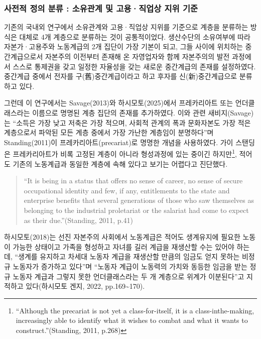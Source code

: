 \documentclass[
  letterpaper,
  DIV=11,
  numbers=noendperiod]{scrartcl}
\begin{document}
\subsubsection{사전적 정의 분류 : 소유관계 및 고용·직업상 지위
기준}\label{uxc0acuxc804uxc801-uxc815uxc758-uxbd84uxb958-uxc18cuxc720uxad00uxacc4-uxbc0f-uxace0uxc6a9uxc9c1uxc5c5uxc0c1-uxc9c0uxc704-uxae30uxc900}

기존의 국내외 연구에서 소유관계와 고용·직업상 지위를 기준으로 계층을
분류하는 방식은 대체로 4개 계층으로 분류하는 것이 공통적이었다.
생산수단의 소유여부에 따라 자본가·고용주와 노동계급의 2개 집단이 가장
기본이 되고, 그들 사이에 위치하는 중간계급으로서 자본주의 이전부터
존재해 온 자영업자와 함께 자본주의의 발전 과정에서 스스로 통제권을 갖고
일정한 자율성을 갖는 새로운 중간계급의 존재를 설정하였다. 중간계급
중에서 전자를 구(舊)중간계급이라고 하고 후자를 신(新)중간계급으로
분류하고 있다.

그런데 이 연구에서는 Savage(2013)와 하시모토(2025)에서 프레카리아트 또는
언더클래스라는 이름으로 명명된 계층 집단의 존재를 추가하였다. 이와 관련
새비지(Savage)는 ``소득은 가장 낮고 저축은 가장 적으며, 사회적 관계의
폭과 문화자본도 가장 적은 계층으로서 파악된 모든 계층 중에서 가장 가난한
계층임이 분명하다''며 Standing(2011)이 프레카리아트(precariat)로 명명한
개념을 사용하였다. 가이 스탠딩은 프레카리아트가 비록 고정된 계층이
아니라 형성과정에 있는 중이긴 하지만\footnote{``Although the precariat
  is not yet a class-for-itself, it is a class-inthe-making,
  increasingly able to identify what it wishes to combat and what it
  wants to construct.''(Standing, 2011, p.268)}, 적어도 기존의
노동계급과 동일한 계층에 속해 있다고 보기는 어렵다고 진단했다.

\begin{quote}
``It is being in a status that offers no sense of career, no sense of
secure occupational identity and few, if any, entitlements to the state
and enterprise benefits that several generations of those who saw
themselves as belonging to the industrial proletariat or the salariat
had come to expect as their due.''(Standing, 2011, p.41)
\end{quote}

하시모토(2018)는 선진 자본주의 사회에서 노동계급은 적어도 생계유지에
필요한 노동이 가능한 상태이고 가족을 형성하고 자녀를 길러 계급을
재생산할 수는 있어야 하는데, ``생계를 유지하고 차세대 노동자 계급을
재생산할 만큼의 임금도 얻지 못하는 비정규 노동자가 증가하고 있다''며
``노동자 계급이 노동력의 가치와 동등한 임금을 받는 정규 노동자 계급과
그렇지 못한 언더클래스라는 두 개 계층으로 위계가 이분된다''고 지적하고
있다(하시모토 겐지, 2022, pp.169\textasciitilde170).
\end{document}
